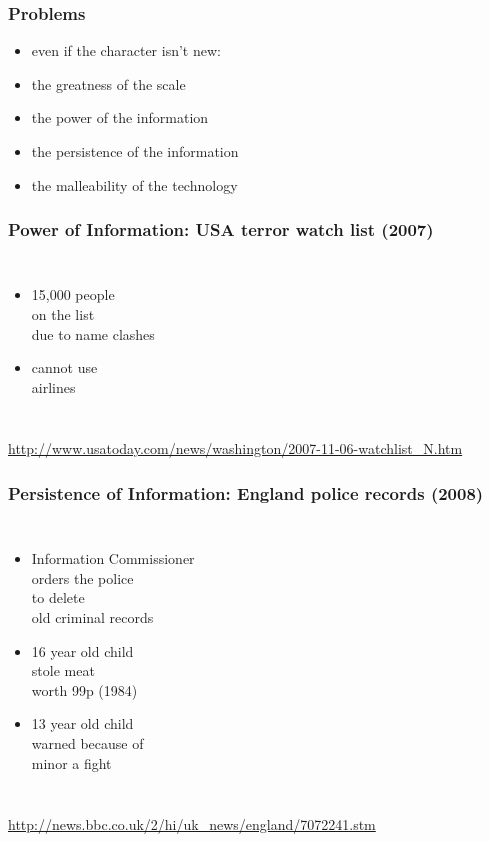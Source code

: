 \documentclass[dvipsnames]{beamer}
\theoremstyle{plain}
\begin{document}
\begin{frame}
  \frametitle{Problems}

  \begin{itemize}
    \item even if the character isn't new:

    \medskip
    \item the greatness of the scale
    \item the power of the information
    \item the persistence of the information
    \item the malleability of the technology
  \end{itemize}
\end{frame}

\begin{frame}
  \frametitle{Power of Information: USA terror watch list (2007)}

  \begin{columns}

    \begin{itemize}
      \item 15,000 people\\
        on the list\\
        due to name clashes
      \item cannot use\\
        airlines
    \end{itemize}
  \end{columns}

  \medskip
  \tiny{\url{http://www.usatoday.com/news/washington/2007-11-06-watchlist_N.htm}}
\end{frame}

\begin{frame}
  \frametitle{Persistence of Information: England police records (2008)}

  \begin{columns}

    \begin{itemize}
      \item Information Commissioner\\
        orders the police\\
        to delete\\
        old criminal records

      \medskip
      \item 16 year old child\\
        stole meat\\
        worth 99p (1984)
      \item 13 year old child\\
        warned because of\\
        minor a fight
    \end{itemize}
  \end{columns}

  \medskip
  \tiny{\url{http://news.bbc.co.uk/2/hi/uk_news/england/7072241.stm}}
\end{frame}
\end{document}
